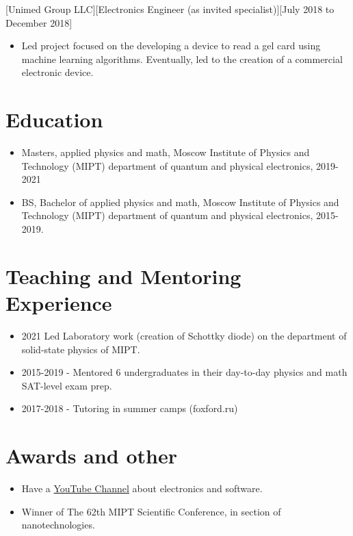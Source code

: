 \documentclass{article}
\begin{document}
[Unimed Group LLC][Electronics Engineer (as invited specialist)][July 2018 to December 2018]
 
\begin{itemize}
\item Led project focused on the developing a device to read a gel card using machine learning algorithms. Eventually, led to the creation of a commercial electronic device.
\end{itemize}
 
 
\section{Education}
 
\begin{itemize}
\item Masters, applied physics and math, Moscow Institute of Physics and Technology (MIPT) department of quantum and physical electronics, 2019-2021
\item BS, Bachelor of applied physics and math, Moscow Institute of Physics and Technology (MIPT) department of quantum and physical electronics, 2015-2019.
\end{itemize}

\section{Teaching and Mentoring Experience }
\begin{itemize}
\item 2021 Led Laboratory work (creation of Schottky diode) on the department of solid-state physics of MIPT. 
\item 2015-2019 - Mentored 6 undergraduates in their day-to-day physics and math SAT-level exam prep.
\item 2017-2018 - Tutoring in summer camps (foxford.ru)
\end{itemize}
 
\section{Awards and other}
\begin{itemize}
\item Have a \href{https://www.youtube.com/channel/UCAjmXQnYQjWoVHx6NIo24CQ}{YouTube Channel} about electronics and software.   
\item Winner of The 62th MIPT Scientific Conference, in section of nanotechnologies.
\end{itemize}
 
\end{document}
